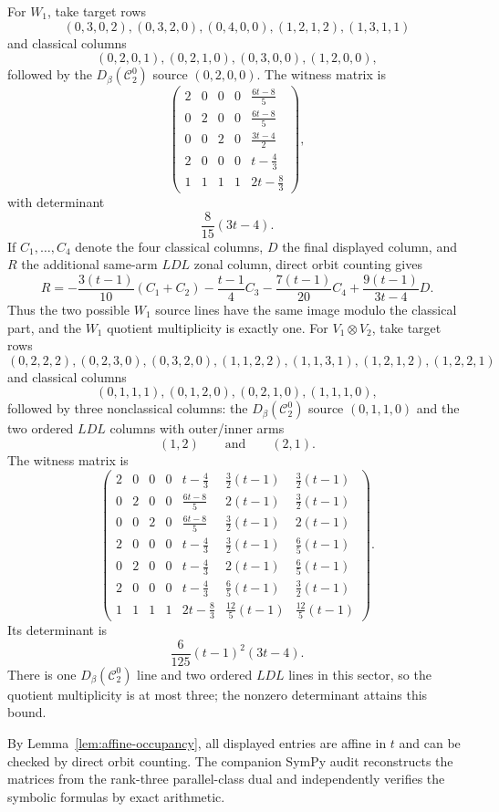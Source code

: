 \documentclass[11pt]{amsart}
\theoremstyle{definition}
\theoremstyle{remark}
\newcommand{\cc}{\mathcal}
\begin{document}
For $W_1$, take target rows
\[
(0,3,0,2),(0,3,2,0),(0,4,0,0),(1,2,1,2),(1,3,1,1)
\]
and classical columns
\[
(0,2,0,1),(0,2,1,0),(0,3,0,0),(1,2,0,0),
\]
followed by the $D_\beta(\cc C_2^0)$ source $(0,2,0,0)$.  The witness matrix is
\[
\begin{pmatrix}
2&0&0&0&\frac{6t-8}{5}\\
0&2&0&0&\frac{6t-8}{5}\\
0&0&2&0&\frac{3t-4}{2}\\
2&0&0&0&t-\frac43\\
1&1&1&1&2t-\frac83
\end{pmatrix},
\]
with determinant
\[
\frac8{15}(3t-4).
\]
If $C_1,\ldots,C_4$ denote the four classical columns, $D$ the final displayed column, and $R$ the additional same-arm $L D L$ zonal column, direct orbit counting gives
\[
R=-\frac{3(t-1)}{10}(C_1+C_2)-\frac{t-1}{4}C_3
-\frac{7(t-1)}{20}C_4+\frac{9(t-1)}{3t-4}D.
\]
Thus the two possible $W_1$ source lines have the same image modulo the classical part, and the $W_1$ quotient multiplicity is exactly one.
For $V_1\otimes V_2$, take target rows
\[
(0,2,2,2),(0,2,3,0),(0,3,2,0),(1,1,2,2),(1,1,3,1),(1,2,1,2),(1,2,2,1)
\]
and classical columns
\[
(0,1,1,1),(0,1,2,0),(0,2,1,0),(1,1,1,0),
\]
followed by three nonclassical columns: the $D_\beta(\cc C_2^0)$ source $(0,1,1,0)$ and the two ordered $L D L$ columns with outer/inner arms
\[
(1,2)\qquad\text{and}\qquad(2,1).
\]
The witness matrix is
{\scriptsize
\[
\begin{pmatrix}
2&0&0&0&t-\frac43&\frac32(t-1)&\frac32(t-1)\\
0&2&0&0&\frac{6t-8}{5}&2(t-1)&\frac32(t-1)\\
0&0&2&0&\frac{6t-8}{5}&\frac32(t-1)&2(t-1)\\
2&0&0&0&t-\frac43&\frac32(t-1)&\frac65(t-1)\\
0&2&0&0&t-\frac43&2(t-1)&\frac65(t-1)\\
2&0&0&0&t-\frac43&\frac65(t-1)&\frac32(t-1)\\
1&1&1&1&2t-\frac83&\frac{12}{5}(t-1)&\frac{12}{5}(t-1)
\end{pmatrix}.
\]
}
Its determinant is
\[
\frac6{125}(t-1)^2(3t-4).
\]
There is one $D_\beta(\cc C_2^0)$ line and two ordered $L D L$ lines in this sector, so the quotient multiplicity is at most three; the nonzero determinant attains this bound.

By Lemma~\ref{lem:affine-occupancy}, all displayed entries are affine in $t$ and can be checked by direct orbit counting.  The companion SymPy audit reconstructs the matrices from the rank-three parallel-class dual and independently verifies the symbolic formulas by exact arithmetic.
\end{document}
